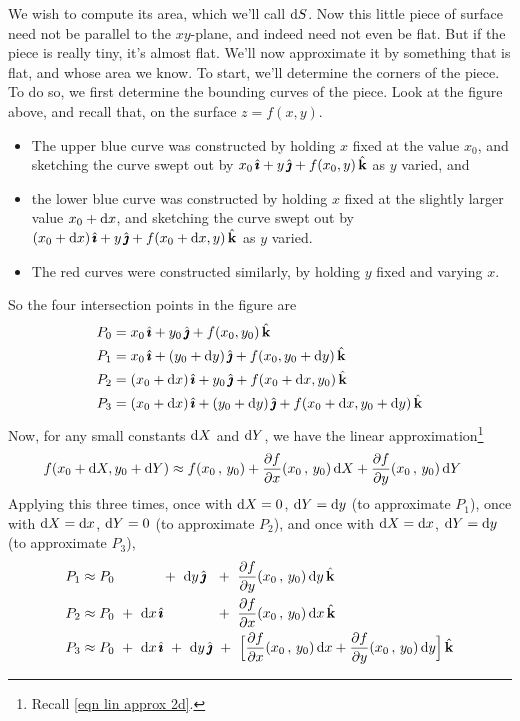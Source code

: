We wish to compute its area, which we'll call $\mathrm{d}S$.
Now this little piece of surface need not be parallel to the $xy$-plane,
and indeed need not even be flat. But if the piece is really tiny, it's
almost flat. We'll now approximate it by something that is flat,
and whose area we know. To start, we'll determine the corners of the piece.
To do so, we first determine the bounding curves of the piece. 
Look at the figure above, and recall that, on the surface $z=f(x,y)$.
\begin{itemize}
\item 
The  upper blue curve was constructed by holding $x$ fixed 
at the value $x_0$, and sketching the curve swept out by 
$x_0\,\hat{\pmb{\imath}}+y\,\hat{\pmb{\jmath}} + f(x_0,y)\,\hat{\mathbf{k}}$ as $y$ varied, and 

\item
the  lower blue curve was constructed by holding $x$ fixed 
at the slightly larger value $x_0+\mathrm{d}x$, and sketching the 
curve swept out by  $(x_0+\mathrm{d}x)\,\hat{\pmb{\imath}}+y\,\hat{\pmb{\jmath}} + f(x_0+\mathrm{d}x,y)\,\hat{\mathbf{k}}$ as 
$y$ varied. 

\item 
The red curves were constructed similarly, by holding $y$ fixed
and varying $x$.
\end{itemize}
So the four intersection points in the figure are
\begin{alignat*}{3}
P_0&=x_0\,\hat{\pmb{\imath}}+y_0\,\hat{\pmb{\jmath}} + f(x_0,y_0)\,\hat{\mathbf{k}} \\
   P_1&=x_0\,\hat{\pmb{\imath}}+(y_0+\mathrm{d}y)\,\hat{\pmb{\jmath}} + f(x_0,y_0+\mathrm{d}y)\,\hat{\mathbf{k}} \\
P_2&=(x_0+\mathrm{d}x)\,\hat{\pmb{\imath}}+y_0\,\hat{\pmb{\jmath}} + f(x_0+\mathrm{d}x,y_0)\,\hat{\mathbf{k}} \\
   P_3&=(x_0+\mathrm{d}x)\,\hat{\pmb{\imath}}+(y_0+\mathrm{d}y)\,\hat{\pmb{\jmath}} + f(x_0+\mathrm{d}x,y_0+\mathrm{d}y)\,\hat{\mathbf{k}} 
\end{alignat*}
Now, for any small constants $\mathrm{d}X$ and $\mathrm{d}Y$, we have the linear
approximation\footnote{Recall \eqref{eqn lin approx 2d}.}
\begin{align*}
f(x_0+\dee{X},y_0+\dee{Y})
&\approx f(x_0\,,\,y_0)
   +\pdiff{f}{x}(x_0\,,\,y_0)\,\dee{X}
   +\pdiff{f}{y}(x_0\,,\,y_0)\,\dee{Y}
\end{align*}
Applying this three times, 
once with $\mathrm{d}X=0$, $\mathrm{d}Y=\mathrm{d}y$ (to approximate $P_1$),
once with $\mathrm{d}X=\mathrm{d}x$, $\mathrm{d}Y=0$ (to approximate $P_2$), 
and once with  $\mathrm{d}X=\mathrm{d}x$, $\mathrm{d}Y=\mathrm{d}y$ (to approximate $P_3$),
\begin{alignat*}{3}
P_1&\approx P_0 \phantom{\ +\ \dee{x}\,\hi}
   \ +\ \dee{y}\,\hj\ \ +\   \pdiff{f}{y}(x_0\,,\,y_0)\,\dee{y}\,\hk\\
P_2&\approx P_0
   \ +\ \dee{x}\,\hi  \phantom{\ +\  \dee{y}\,\hj} 
   \ \ +\  \pdiff{f}{x}(x_0\,,\,y_0)\,\dee{x}\,\hk\\
P_3&\approx P_0
   \ +\ \dee{x}\,\hi\ +\ \dee{y}\,\hj \ +\  
           \Big[ \pdiff{f}{x}(x_0\,,\,y_0)\,\dee{x}
                               +  \pdiff{f}{y}(x_0\,,\,y_0)\,\dee{y}\Big]\,\hk
\end{alignat*}
